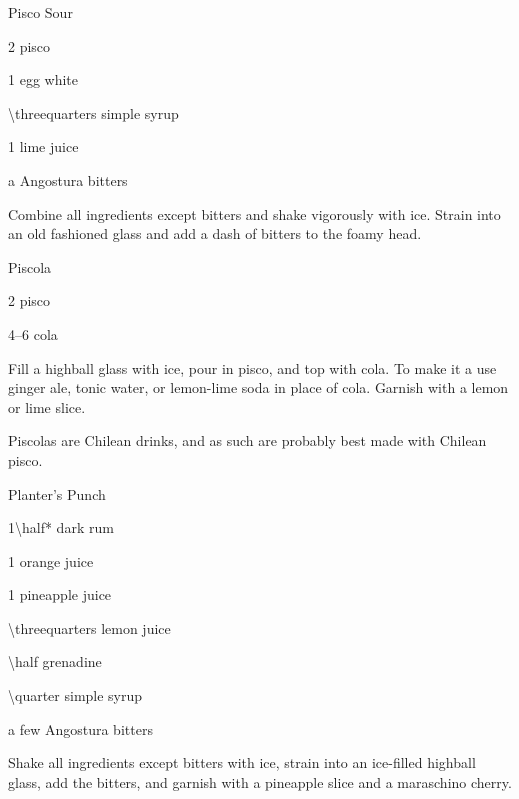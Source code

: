 \begin{Cocktail}{Pisco Sour}
	\begin{Ingredients}
	\item \SI{2}{\oz} pisco
	\item 1 egg white
	\item \SI{\threequarters}{\oz} simple syrup
	\item \SI{1}{\oz} lime juice
	\item a \si{\dash} Angostura bitters
	\end{Ingredients}
	
	\begin{Instructions}
	Combine all ingredients except bitters and shake vigorously with ice.  Strain into an old fashioned glass and add a dash of bitters to the foamy head.
	\end{Instructions}
\end{Cocktail}

\begin{Cocktail}{Piscola}
	\begin{Ingredients}
	\item \SI{2}{\oz} pisco
	\item \SIrange{4}{6}{\oz} cola
	\end{Ingredients}
	
	\begin{Instructions}
	Fill a highball glass with ice, pour in pisco, and top with cola.  To make it a  use ginger ale, tonic water, or lemon-lime soda in place of cola.  Garnish with a lemon or lime slice.
	
	Piscolas are Chilean drinks, and as such are probably best made with Chilean pisco.
	\end{Instructions}
\end{Cocktail}

\begin{Cocktail}{Planter's Punch}
	\begin{Ingredients}
	\item \SI{1\half*}{\oz} dark rum
	\item \SI{1}{\oz} orange juice
	\item \SI{1}{\oz} pineapple juice
	\item \SI{\threequarters}{\oz} lemon juice
	\item \SI{\half}{\oz} grenadine
	\item \SI{\quarter}{\oz} simple syrup
	\item a few \si{\dashes} Angostura bitters
	\end{Ingredients}
	
	\begin{Instructions}
	Shake all ingredients except bitters with ice, strain into an ice-filled highball glass, add the bitters, and garnish with a pineapple slice and a maraschino cherry.
	\end{Instructions}
\end{Cocktail}


